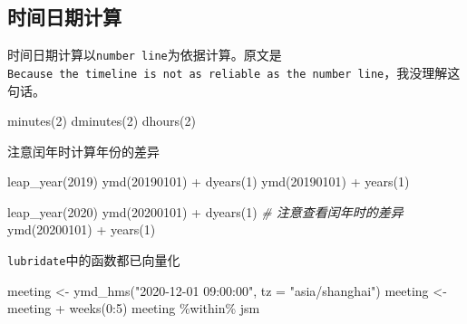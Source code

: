 \documentclass[
]{book}
\newenvironment{Shaded}{\begin{snugshade}}{\end{snugshade}}
\newcommand{\AttributeTok}[1]{\textcolor[rgb]{0.77,0.63,0.00}{#1}}
\newcommand{\CommentTok}[1]{\textcolor[rgb]{0.56,0.35,0.01}{\textit{#1}}}
\newcommand{\DecValTok}[1]{\textcolor[rgb]{0.00,0.00,0.81}{#1}}
\newcommand{\FunctionTok}[1]{\textcolor[rgb]{0.00,0.00,0.00}{#1}}
\newcommand{\NormalTok}[1]{#1}
\newcommand{\OtherTok}[1]{\textcolor[rgb]{0.56,0.35,0.01}{#1}}
\newcommand{\SpecialCharTok}[1]{\textcolor[rgb]{0.00,0.00,0.00}{#1}}
\newcommand{\StringTok}[1]{\textcolor[rgb]{0.31,0.60,0.02}{#1}}
\begin{document}
\hypertarget{calculate-datetime}{%
\subsection{时间日期计算}\label{calculate-datetime}}

时间日期计算以\texttt{number\ line}为依据计算。原文是\texttt{Because\ the\ timeline\ is\ not\ as\ reliable\ as\ the\ number\ line}，我没理解这句话。

\begin{Shaded}
\begin{Highlighting}[]
\FunctionTok{minutes}\NormalTok{(}\DecValTok{2}\NormalTok{)}
\FunctionTok{dminutes}\NormalTok{(}\DecValTok{2}\NormalTok{)}
\FunctionTok{dhours}\NormalTok{(}\DecValTok{2}\NormalTok{)}
\end{Highlighting}
\end{Shaded}

注意闰年时计算年份的差异

\begin{Shaded}
\begin{Highlighting}[]
\FunctionTok{leap\_year}\NormalTok{(}\DecValTok{2019}\NormalTok{)}
\FunctionTok{ymd}\NormalTok{(}\DecValTok{20190101}\NormalTok{) }\SpecialCharTok{+} \FunctionTok{dyears}\NormalTok{(}\DecValTok{1}\NormalTok{)}
\FunctionTok{ymd}\NormalTok{(}\DecValTok{20190101}\NormalTok{) }\SpecialCharTok{+} \FunctionTok{years}\NormalTok{(}\DecValTok{1}\NormalTok{)}

\FunctionTok{leap\_year}\NormalTok{(}\DecValTok{2020}\NormalTok{)}
\FunctionTok{ymd}\NormalTok{(}\DecValTok{20200101}\NormalTok{) }\SpecialCharTok{+} \FunctionTok{dyears}\NormalTok{(}\DecValTok{1}\NormalTok{)  }\CommentTok{\# 注意查看闰年时的差异}
\FunctionTok{ymd}\NormalTok{(}\DecValTok{20200101}\NormalTok{) }\SpecialCharTok{+} \FunctionTok{years}\NormalTok{(}\DecValTok{1}\NormalTok{)}
\end{Highlighting}
\end{Shaded}

\texttt{lubridate}中的函数都已向量化

\begin{Shaded}
\begin{Highlighting}[]
\NormalTok{meeting }\OtherTok{\textless{}{-}} \FunctionTok{ymd\_hms}\NormalTok{(}\StringTok{"2020{-}12{-}01 09:00:00"}\NormalTok{, }\AttributeTok{tz =} \StringTok{"asia/shanghai"}\NormalTok{)}
\NormalTok{meeting }\OtherTok{\textless{}{-}}\NormalTok{ meeting }\SpecialCharTok{+} \FunctionTok{weeks}\NormalTok{(}\DecValTok{0}\SpecialCharTok{:}\DecValTok{5}\NormalTok{)}
\NormalTok{meeting }\SpecialCharTok{\%within\%}\NormalTok{ jsm}
\end{Highlighting}
\end{Shaded}
\end{document}
